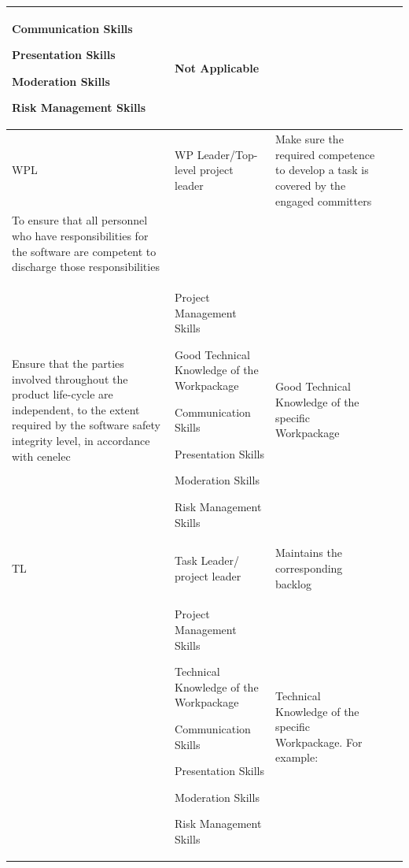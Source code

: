 \documentclass{template/openetcs_article}
\begin{document}
\begin{landscape}
\begin{appendices}
\begin{center}
\begin{longtable}{|m{1cm}|m{}|m{}|m{}|m{}|}
Communication Skills

Presentation Skills

Moderation Skills

Risk Management Skills

 &
Not Applicable \\\hline
WPL &
\gls{WP} Leader/Top-level project leader &
\raggedright
Make sure the required competence to develop a task is covered by the engaged committers\\
To ensure that all personnel who have responsibilities for the software are competent to discharge those responsibilities\\
Ensure that the parties involved throughout the product life-cycle are independent, to the extent required by the software safety integrity level, in accordance with cenelec
&
Project Management Skills

Good Technical Knowledge of the Workpackage

Communication Skills

Presentation Skills

Moderation Skills

Risk Management Skills

&
Good Technical Knowledge of the specific Workpackage \\\hline
TL &
Task Leader/ project leader &
\raggedright
Maintains the corresponding backlog\\
&
Project Management Skills 

Technical Knowledge of the Workpackage

Communication Skills

Presentation Skills

Moderation Skills

Risk Management Skills

&
Technical Knowledge of the specific Workpackage. For example:


\end{longtable}
\end{center}
\end{appendices}
\end{landscape}
\end{document}
